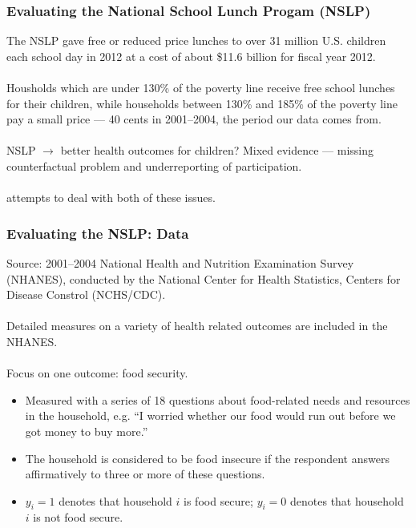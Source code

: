 \documentclass[xcolor=dvipsnames]{beamer}
\begin{document}
\begin{frame}
  \frametitle{Evaluating the National School Lunch Progam (NSLP)}
The NSLP gave free or reduced price lunches to over 31 million U.S. children each school day in 2012 at a cost of about \$11.6 billion for fiscal year 2012.\\~\\

Housholds which are under 130\% of the poverty line receive free school lunches for their children, while households between 130\% and 185\% of the poverty line pay a small price --- 40 cents in 2001--2004, the period our data comes from.\\~\\

NSLP $\to$ better health outcomes for children? Mixed evidence --- missing counterfactual problem and underreporting of participation.\\~\\

\citet{gundersen2012impact} attempts to deal with both of these issues.

\end{frame}

\begin{frame}
\frametitle{Evaluating the NSLP: Data}
Source: 2001--2004 National Health and Nutrition Examination Survey (NHANES), conducted by the National Center for Health Statistics, Centers for Disease Constrol (NCHS/CDC).\\~\\

Detailed measures on a variety of health related outcomes are included in the NHANES.\\~\\

\pause Focus on one outcome: food security.

\begin{itemize}
\item Measured with a series of 18 questions about food-related needs and resources in the household, e.g. ``I worried whether our food would run out before we got money to buy more.'' 
\item The household is considered to be food insecure if the respondent answers affirmatively to three or more of these questions.
\item $y_i=1$ denotes that household $i$ is food secure; $y_i=0$ denotes that household $i$ is not food secure.
\end{itemize}
\end{frame}
    
\end{document}
